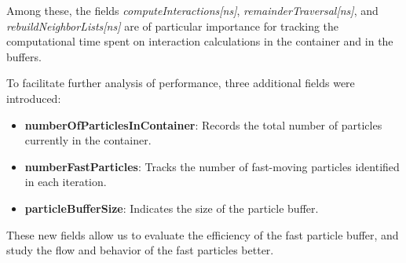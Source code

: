 Among these, the fields \textit{computeInteractions[ns]}, \textit{remainderTraversal[ns]}, and \textit{rebuildNeighborLists[ns]} are of particular importance for tracking the computational time spent on interaction calculations in the container and in the buffers.

To facilitate further analysis of performance, three additional fields were introduced:
\begin{itemize}
    \item \textbf{numberOfParticlesInContainer}: Records the total number of particles currently in the container.
    \item \textbf{numberFastParticles}: Tracks the number of fast-moving particles identified in each iteration.
    \item \textbf{particleBufferSize}: Indicates the size of the particle buffer.
\end{itemize}

These new fields allow us to evaluate the efficiency of the fast particle buffer, and study the flow and behavior of the fast particles better.